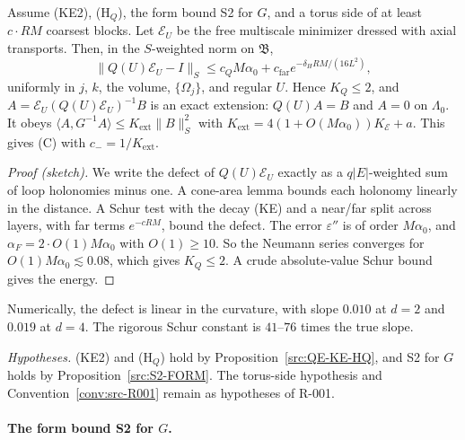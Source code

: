 \begin{proposition}[Theorem QE (L-252)]\label{src:QE-INV}
Assume (KE2), (H$_Q$), the form bound S2 for $G$, and a torus side of at least $c\cdot RM$ coarsest blocks. Let $\mathcal E_U$ be the free multiscale minimizer dressed with axial transports. Then, in the $S$-weighted norm on $\mathfrak B$,
\[
\|Q(U)\mathcal E_U-I\|_S\le c_QM\alpha_0+c_{\mathrm{far}}e^{-\delta_HRM/(16L^2)},
\]
uniformly in $j$, $k$, the volume, $\{\Omega_j\}$, and regular $U$. Hence $K_Q\le2$, and $A=\mathcal E_U(Q(U)\mathcal E_U)^{-1}B$ is an exact extension: $Q(U)A=B$ and $A=0$ on $\Lambda_0$. It obeys $\langle A,G^{-1}A\rangle\le K_{\mathrm{ext}}\|B\|_S^2$ with $K_{\mathrm{ext}}=4(1+O(M\alpha_0))K_{\mathcal E}+a$. This gives (C) with $c_-=1/K_{\mathrm{ext}}$.
\end{proposition}
\begin{proof}[Proof (sketch)]
We write the defect of $Q(U)\mathcal E_U$ exactly as a $q|E|$-weighted sum of loop holonomies minus one. A cone-area lemma bounds each holonomy linearly in the distance. A Schur test with the decay (KE) and a near/far split across layers, with far terms $e^{-cRM}$, bound the defect. The error $\varepsilon''$ is of order $M\alpha_0$, and $\alpha_F=2\cdot O(1)M\alpha_0$ with $O(1)\ge10$. So the Neumann series converges for $O(1)M\alpha_0\lesssim0.08$, which gives $K_Q\le2$. A crude absolute-value Schur bound gives the energy.
\end{proof}
Numerically, the defect is linear in the curvature, with slope $0.010$ at $d=2$ and $0.019$ at $d=4$. The rigorous Schur constant is $41$--$76$ times the true slope.

\emph{Hypotheses.} (KE2) and (H$_Q$) hold by Proposition~\ref{src:QE-KE-HQ}, and S2 for $G$ holds by Proposition~\ref{src:S2-FORM}. The torus-side hypothesis and Convention~\ref{conv:src-R001} remain as hypotheses of R-001.

\paragraph{The form bound S2 for $G$.}

